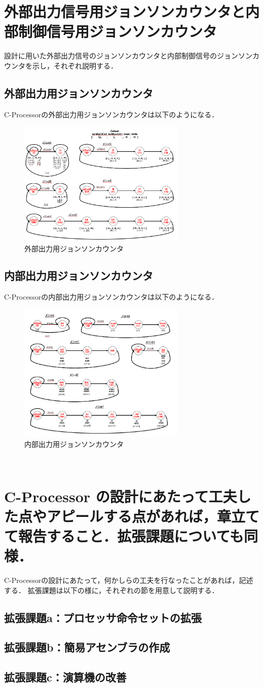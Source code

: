 \documentclass[dvipdfmx]{jarticle}
\begin{document}
\section{外部出力信号用ジョンソンカウンタと内部制御信号用ジョンソンカウンタ}
設計に用いた外部出力信号のジョンソンカウンタと内部制御信号のジョンソンカウンタを示し，それぞれ説明する．
\clearpage
\subsection{外部出力用ジョンソンカウンタ}
C-Processorの外部出力用ジョンソンカウンタは以下のようになる．
\begin{figure}[h]
  \centering
  \includegraphics[width = 8cm]{ext.png}
  \caption{外部出力用ジョンソンカウンタ}
\end{figure}
\subsection{内部出力用ジョンソンカウンタ}
C-Processorの内部出力用ジョンソンカウンタは以下のようになる．
\begin{figure}[h]
  \centering
  \includegraphics[width = 8cm]{int.png}
  \caption{内部出力用ジョンソンカウンタ}
\end{figure}
~\\
\section{C-Processor の設計にあたって工夫した点やアピールする点があれば，章立てて報告すること．拡張課題についても同様．}
C-Processorの設計にあたって，何かしらの工夫を行なったことがあれば，記述する．
拡張課題は以下の様に，それぞれの節を用意して説明する．
\subsection{拡張課題a：プロセッサ命令セットの拡張}
\subsection{拡張課題b：簡易アセンブラの作成}
\subsection{拡張課題c：演算機の改善}
\end{document}
